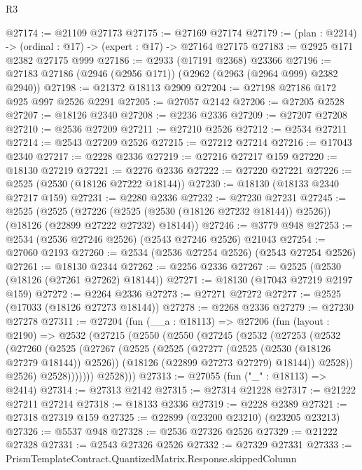 \begin{lexlean}{R3}
\begin{coremodule}
@27174 := @21109 @27173
@27175 := @27169 @27174
@27179 := (plan : @2214) -> (ordinal : @17) -> (expert : @17) -> @27164 @27175
@27183 := @2925 @171 @2382 @27175 @999
@27186 := @2933 (@17191 @2368) @23366
@27196 := @27183 @27186 (@2946 (@2956 @171)) (@2962 (@2963 (@2964 @999) @2382 @2940))
@27198 := @21372 @18113 @2909
@27204 := @27198 @27186 @172 @925 @997 @2526 @2291
@27205 := @27057 @2142
@27206 := @27205 @2528
@27207 := @18126 @2340
@27208 := @2236 @2336
@27209 := @27207 @27208
@27210 := @2536 @27209
@27211 := @27210 @2526
@27212 := @2534 @27211
@27214 := @2543 @27209 @2526
@27215 := @27212 @27214
@27216 := @17043 @2340
@27217 := @2228 @2336
@27219 := @27216 @27217 @159
@27220 := @18130 @27219
@27221 := @2276 @2336
@27222 := @27220 @27221
@27226 := @2525 (@2530 (@18126 @27222 @18144))
@27230 := @18130 (@18133 @2340 @27217 @159)
@27231 := @2280 @2336
@27232 := @27230 @27231
@27245 := @2525
    (@2525
      (@27226 (@2525 (@2530 (@18126 @27232 @18144)) @2526))
      (@18126 (@22899 @27222 @27232) @18144))
@27246 := @3779 @948
@27253 := @2534 (@2536 @27246 @2526) (@2543 @27246 @2526) @21043
@27254 := @27060 @2193
@27260 := @2534 (@2536 @27254 @2526) (@2543 @27254 @2526)
@27261 := @18130 @2344
@27262 := @2256 @2336
@27267 := @2525 (@2530 (@18126 (@27261 @27262) @18144))
@27271 := @18130 (@17043 @27219 @2197 @159)
@27272 := @2264 @2336
@27273 := @27271 @27272
@27277 := @2525 (@17033 (@18126 @27273 @18144))
@27278 := @2268 @2336
@27279 := @27230 @27278
@27311 := @27204
    (fun (__a : @18113) =>
    @27206
      (fun (layout : @2190) =>
      @2532
        (@27215
          (@2550
            (@2550
              (@27245
                (@2532
                  (@27253
                    (@2532
                      (@27260
                        (@2525
                          (@27267
                            (@2525
                              (@2525
                                (@27277 (@2525 (@2530 (@18126 @27279 @18144)) @2526))
                                (@18126 (@22899 @27273 @27279) @18144))
                              @2528))
                          @2526)
                        @2528)))))))
          @2528)))
@27313 := @27055 (fun ("_" : @18113) => @2414)
@27314 := @27313 @2142
@27315 := @27314 @21228
@27317 := @21222 @27211 @27214
@27318 := @18133 @2336
@27319 := @2228 @2389
@27321 := @27318 @27319 @159
@27325 := @22899 (@23200 @23210) (@23205 @23213)
@27326 := @5537 @948
@27328 := @2536 @27326 @2526
@27329 := @21222 @27328
@27331 := @2543 @27326 @2526
@27332 := @27329 @27331
@27333 := PrismTemplateContract.QuantizedMatrix.Response.skippedColumn

\end{coremodule}
\end{lexlean}
